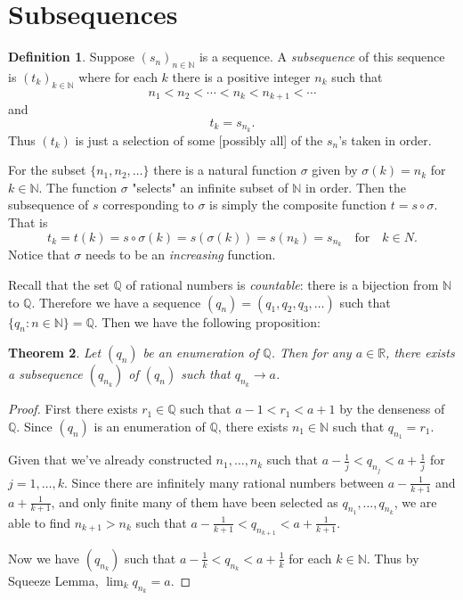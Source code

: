 \documentclass[12pt, lettersize]{book}
\theoremstyle{plain}
\newtheorem{thm}{Theorem}[section]
\theoremstyle{definition}
\newtheorem{dfn}[thm]{Definition}
\theoremstyle{remark}
\newcommand{\R}{\mathbb{R}}
\newcommand{\N}{\mathbb{N}}
\newcommand{\Q}{\mathbb{Q}}
\begin{document}
	\section{Subsequences}
		\begin{dfn}
		Suppose $(s_n)_{n\in\mathbb{N}}$ is a sequence. A \emph{subsequence} of this sequence is $(t_k)_{k\in\mathbb{N}}$ where for each $k$ there is a positive integer $n_k$ such that
		\begin{equation*}
			n_1<n_2<\cdots<n_k<n_{k+1}<\cdots
		\end{equation*}
		and
		\begin{equation*}
			t_k=s_{n_k}.
		\end{equation*}
		Thus $(t_k)$ is just a selection of some [possibly all] of the $s_n$'s taken in order.
		\end{dfn}
		For the subset $\{n_1,n_2,\dots\}$ there is a natural function $\sigma$ given by $\sigma(k)=n_k$ for $k\in\mathbb{N}$. The function $\sigma$ "selects" an infinite subset of $\mathbb{N}$ in order. Then
		the subsequence of $s$ corresponding to $\sigma$ is simply the composite function $t=s\circ\sigma$. That is
		\begin{displaymath}
			t_k=t(k)=s\circ\sigma(k)=s(\sigma(k))=s(n_k)=s_{n_k}\quad\text{for}\quad k\in N.
		\end{displaymath}
		Notice that $\sigma$ needs to be an \emph{increasing} function. 
		
		Recall that the set $\Q$ of rational numbers is \emph{countable}: there is a bijection from $\N$ to $\Q$. Therefore we have a sequence $(q_n)=(q_1,q_2,q_3,\dots)$ such that $\{q_n: n\in\N\}=\Q$. Then we have the following proposition:
		\begin{thm}
		Let $(q_n)$ be an enumeration of $\Q$. Then for any $a\in\R$, there exists a subsequence $(q_{n_k})$ of $(q_n)$ such that $q_{n_k}\rightarrow a$.
		\end{thm}
		\begin{proof}
		First there exists $r_1\in\Q$ such that $a-1<r_1<a+1$ by the denseness of $\Q$. Since $(q_n)$ is an enumeration of $\Q$, there exists $n_1\in\N$ such that $q_{n_1}=r_1$.
		
		Given that we've already constructed $n_1,\dots,n_k$ such that $a-\frac{1}{j}<q_{n_j}<a+\frac{1}{j}$ for $j=1,\dots,k$. Since there are infinitely many rational numbers between $a-\frac{1}{k+1}$ and $a+\frac{1}{k+1}$, and only finite many of them have been selected as $q_{n_1},\dots,q_{n_k}$, we are able to find $n_{k+1}>n_k$ such that $a-\frac{1}{k+1}<q_{n_{k+1}}<a+\frac{1}{k+1}$. 
		
		Now we have $(q_{n_k})$ such that $a-\frac{1}{k}<q_{n_k}<a+\frac{1}{k}$ for each $k\in\N$. Thus by Squeeze Lemma, $\lim_k q_{n_k}=a$.
		\end{proof}
	
\end{document}
